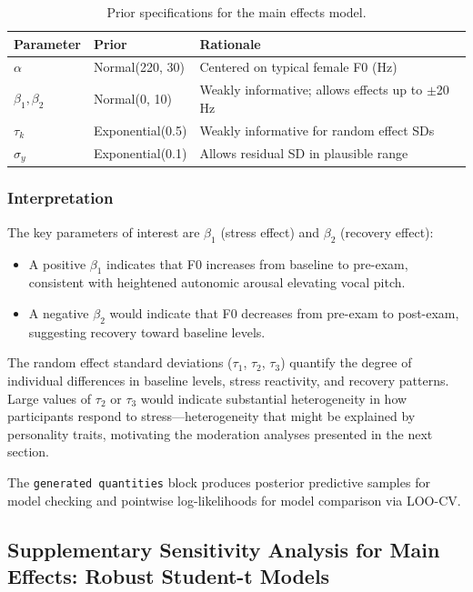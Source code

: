 \documentclass[
  english,
  man,floatsintext]{apa6}
\providecommand{\tightlist}{%
  \setlength{\itemsep}{0pt}\setlength{\parskip}{0pt}}
\begin{document}
\begin{table}

\caption{\label{tab:table-s8-priors-main}Prior specifications for the main effects model.}
\centering
\begin{tabular}[t]{lll}
\toprule
Parameter & Prior & Rationale\\
\midrule
$\alpha$ & Normal(220, 30) & Centered on typical female F0 (Hz)\\
$\beta_1, \beta_2$ & Normal(0, 10) & Weakly informative; allows effects up to $\pm$20 Hz\\
$\tau_k$ & Exponential(0.5) & Weakly informative for random effect SDs\\
$\sigma_y$ & Exponential(0.1) & Allows residual SD in plausible range\\
\bottomrule
\end{tabular}
\end{table}

\subsubsection{Interpretation}\label{interpretation}

The key parameters of interest are \(\beta_1\) (stress effect) and \(\beta_2\) (recovery effect):

\begin{itemize}
\tightlist
\item
  A positive \(\beta_1\) indicates that F0 increases from baseline to pre-exam, consistent with heightened autonomic arousal elevating vocal pitch.
\item
  A negative \(\beta_2\) would indicate that F0 decreases from pre-exam to post-exam, suggesting recovery toward baseline levels.
\end{itemize}

The random effect standard deviations (\(\tau_1\), \(\tau_2\), \(\tau_3\)) quantify the degree of individual differences in baseline levels, stress reactivity, and recovery patterns. Large values of \(\tau_2\) or \(\tau_3\) would indicate substantial heterogeneity in how participants respond to stress---heterogeneity that might be explained by personality traits, motivating the moderation analyses presented in the next section.

The \texttt{generated\ quantities} block produces posterior predictive samples for model checking and pointwise log-likelihoods for model comparison via LOO-CV.

\subsection{Supplementary Sensitivity Analysis for Main Effects: Robust Student-t Models}\label{supplementary-sensitivity-analysis-for-main-effects-robust-student-t-models}
\end{document}
